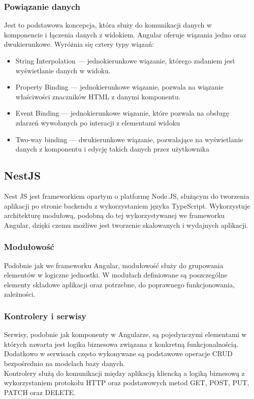 \subsubsection{Powiązanie danych}
Jest to podstawowa koncepcja, która służy do komunikacji danych w komponencie i łączenia danych z widokiem. Angular oferuje wiązania jedno oraz dwukierunkowe. Wyróżnia się cztery typy wiązań:
\begin{itemize}
  \item String Interpolation --- jednokierunkowe wiązanie, którego zadaniem jest wyświetlanie danych w widoku. 
  \item Property Binding --- jednokierunkowe wiązanie, pozwala na wiązanie właściwości znaczników HTML z danymi komponentu.
  \item Event Binding --- jednokierunkowe wiązanie, które pozwala na obsługę zdarzeń wywołanych po interacji z elementami widoku
  \item Two-way binding --- dwukierunkowe wiązanie, pozwalające na wyświetlanie danych z komponentu i edycję takich danych przez użytkownika 
\end{itemize}

\subsection{NestJS}
Nest JS jest frameworkiem opartym o platformę Node.JS, służącym do tworzenia aplikacji po stronie backendu z wykorzystaniem języka TypeScript. Wykorzystuje architekturę modułową, podobną do tej wykorzystywanej we frameworku Angular, dzięki czemu możliwe jest tworzenie skalowanych i wydajnych aplikacji.
\subsubsection{Modułowość}
Podobnie jak we frameworku Angular, modułowość służy do grupowania elementów w logiczne jednostki. W modułach definiowane są poszczególne elementy składowe aplikacji oraz potrzebne, do poprawnego funkcjonowania, zależności.

\subsubsection{Kontrolery i serwisy}
Serwisy, podobnie jak komponenty w Angularze, są pojedynczymi elementami w których zawarta jest logika biznesowa związana z konkretną funkcjonalnością. Dodatkowo w serwisach często wykonywane są podstawowe operacje CRUD bezpośrednio na modelach bazy danych. \\
Kontrolery służą do komunikacji między aplikacją kliencką a logiką biznesową z wykorzystaniem protokołu HTTP oraz podstawowych metod GET, POST, PUT, PATCH oraz DELETE.

